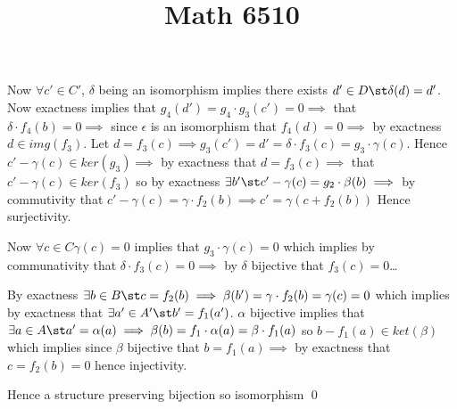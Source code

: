 \documentclass[12pt]{amsart}
\title{Math 6510}
\begin{document}
  \maketitle
  \begin{problem}
    \begin{claim}
      Now $\forall c'\in C'$, $\delta$ being an isomorphism implies there exists $d'\in D\st \delta(d)=d'$. 
      Now exactness implies that $g_4(d')=g_4\cdot g_3(c')=0 \implies$ that $\delta\cdot f_4(b)=0 \implies$ since $\epsilon$ is an isomorphism that $f_4(d)=0\implies$ by exactness $d\in img(f_3)$. 
      Let $d=f_3(c)\implies g_3(c')=d' = \delta \cdot f_3(c) = g_3 \cdot \gamma(c)$. 
      Hence $c'-\gamma(c)\in ker(g_3) \implies$ by exactness that $d=f_3(c) \implies$ that $c'-\gamma(c)\in ker(f_3)$ so by exactness 
      $\exists b'\st c'-\gamma(c)=g_2\cdot \beta(b) \implies$ by commutivity that $c'-\gamma(c)=\gamma\cdot f_2(b) \implies c'=\gamma(c+f_2(b))$ Hence surjectivity. 
    \end{claim} 

    \begin{claim}
      Now $\forall c\in C \gamma(c)=0$ implies that $g_3\cdot \gamma(c)=0$ which implies by communativity that $\delta\cdot f_3(c)=0 \implies$ by $\delta$ bijective that $f_3(c)=0$\dots

      By exactness $\exists b\in B\st c=f_2(b)\implies \beta(b')=\gamma\cdot f_2(b)=\gamma(c)=0$ which implies by exactness that $\exists a'\in A'\st b'=f_1(a')$. $\alpha$ bijective implies that $\exists a\in A\st a'=\alpha(a)\implies \beta(b)=f_1\cdot \alpha(a)=\beta\cdot f_1(a)$ so $b-f_1(a)\in ket(\beta)$ which implies since $\beta$ bijective that $b=f_1(a)\implies$ by exactness that $c=f_2(b)=0$ hence injectivity. 
    \end{claim}
    Hence a structure preserving bijection so isomorphism \qed
  \end{problem}
\end{document}
